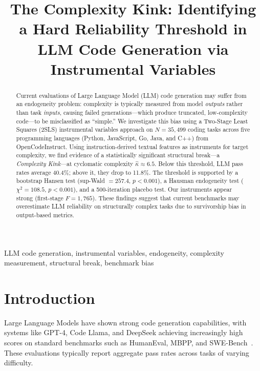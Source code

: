 \documentclass[conference]{IEEEtran}
\title{The Complexity Kink: Identifying a Hard Reliability Threshold in LLM Code Generation via Instrumental Variables}
\author{
\IEEEauthorblockN{Michael Hernandez}
\IEEEauthorblockA{Plethora Solutions, LLC\thanks{\url{https://plethorasolutions.llc}}}
}
\begin{document}
\maketitle

\begin{abstract}
Current evaluations of Large Language Model (LLM) code generation may suffer from an endogeneity problem: complexity is typically measured from model \emph{outputs} rather than task \emph{inputs}, causing failed generations---which produce truncated, low-complexity code---to be misclassified as ``simple.'' We investigate this bias using a Two-Stage Least Squares (2SLS) instrumental variables approach on $N=35{,}499$ coding tasks across five programming languages (Python, JavaScript, Go, Java, and C++) from OpenCodeInstruct. Using instruction-derived textual features as instruments for target complexity, we find evidence of a statistically significant structural break---a \emph{Complexity Kink}---at cyclomatic complexity $\hat{\kappa} \approx 6.5$. Below this threshold, LLM pass rates average 40.4\%; above it, they drop to 11.8\%. The threshold is supported by a bootstrap Hansen test (sup-Wald $= 257.4$, $p < 0.001$), a Hausman endogeneity test ($\chi^2 = 108.5$, $p < 0.001$), and a 500-iteration placebo test. Our instruments appear strong (first-stage $F = 1{,}765$). These findings suggest that current benchmarks may overestimate LLM reliability on structurally complex tasks due to survivorship bias in output-based metrics.
\end{abstract}

\begin{IEEEkeywords}
LLM code generation, instrumental variables, endogeneity, complexity measurement, structural break, benchmark bias
\end{IEEEkeywords}

\section{Introduction}

Large Language Models have shown strong code generation capabilities, with systems like GPT-4, Code Llama, and DeepSeek achieving increasingly high scores on standard benchmarks such as HumanEval, MBPP, and SWE-Bench~\cite{chen2021evaluating, austin2021program}. These evaluations typically report aggregate pass rates across tasks of varying difficulty.
\end{document}
